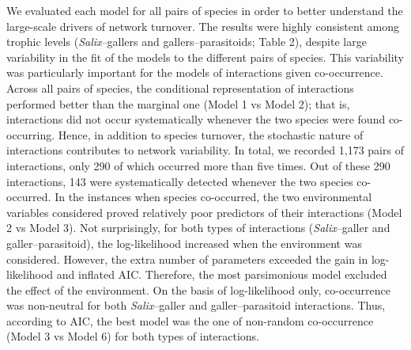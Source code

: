 \documentclass[12pt]{article}
\begin{document}
We evaluated each model for all pairs of species in order to better understand
the large-scale drivers of network turnover. The results were highly
consistent among trophic levels (\textit{Salix}–gallers and
gallers–parasitoids; Table 2), despite large variability in the fit
of the models to the different pairs of species. This variability was
particularly important for the models of interactions given co-occurrence.
Across all pairs of species, the conditional representation of interactions
performed better than the marginal one (Model 1 vs Model 2); that is,
interactions did not occur systematically whenever the two species were found
co-occurring. Hence, in addition to species turnover, the stochastic nature of
interactions contributes to network variability. In total, we recorded 1,173
pairs of interactions, only 290 of which occurred more than five times. Out of
these 290 interactions, 143 were systematically detected whenever the two
species co-occurred. In the instances when species co-occurred, the two
environmental variables considered proved relatively poor predictors of their
interactions (Model 2 vs Model 3). Not surprisingly, for both types of
interactions (\textit{Salix}–galler and galler–parasitoid), the log-likelihood
increased when the environment was considered. However, the extra number of
parameters exceeded the gain in log-likelihood and inflated AIC. Therefore,
the most parsimonious model excluded the effect of the environment. On the
basis of log-likelihood only, co-occurrence was non-neutral for both
\textit{Salix}–galler and galler–parasitoid interactions. Thus, according to
AIC, the best model was the one of non-random co-occurrence (Model 3 vs Model
6) for both types of interactions.

\end{document}
